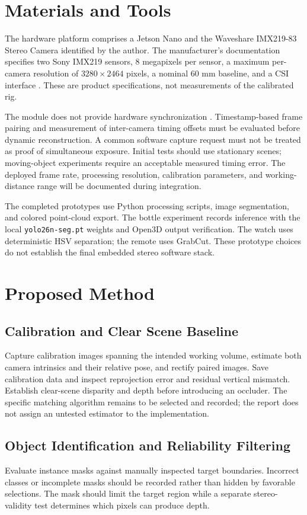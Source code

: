 \section{Materials and Tools}
The hardware platform comprises a Jetson Nano and the Waveshare IMX219-83 Stereo Camera identified by the author. The manufacturer's documentation specifies two Sony IMX219 sensors, 8 megapixels per sensor, a maximum per-camera resolution of $3280\times2464$ pixels, a nominal 60 mm baseline, and a CSI interface \cite{waveshare}. These are product specifications, not measurements of the calibrated rig.

The module does not provide hardware synchronization \cite{waveshare}. Timestamp-based frame pairing and measurement of inter-camera timing offsets must be evaluated before dynamic reconstruction. A common software capture request must not be treated as proof of simultaneous exposure. Initial tests should use stationary scenes; moving-object experiments require an acceptable measured timing error. The deployed frame rate, processing resolution, calibration parameters, and working-distance range will be documented during integration.

The completed prototypes use Python processing scripts, image segmentation, and colored point-cloud export. The bottle experiment records inference with the local \texttt{yolo26n-seg.pt} weights and Open3D output verification. The watch uses deterministic HSV separation; the remote uses GrabCut. These prototype choices do not establish the final embedded stereo software stack.

\section{Proposed Method}
\subsection{Calibration and Clear Scene Baseline}
Capture calibration images spanning the intended working volume, estimate both camera intrinsics and their relative pose, and rectify paired images. Save calibration data and inspect reprojection error and residual vertical mismatch. Establish clear-scene disparity and depth before introducing an occluder. The specific matching algorithm remains to be selected and recorded; the report does not assign an untested estimator to the implementation.

\subsection{Object Identification and Reliability Filtering}
Evaluate instance masks against manually inspected target boundaries. Incorrect classes or incomplete masks should be recorded rather than hidden by favorable selections. The mask should limit the target region while a separate stereo-validity test determines which pixels can produce depth.

